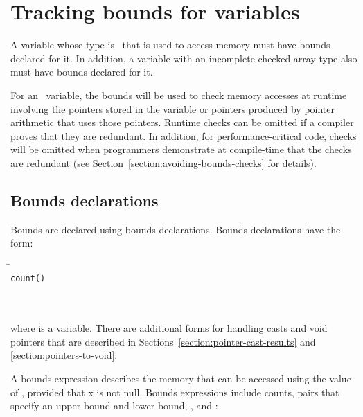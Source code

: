 
\chapter{Tracking bounds for variables}
\label{chapter:tracking-bounds}

A variable whose type is \arrayptr\ that is used to access
memory must have bounds declared for it. In addition, a variable with an
incomplete checked array type also must have bounds declared for it.

For an \arrayptr\ variable, the bounds will be used to check
memory accesses at runtime involving the pointers stored in the variable
or pointers produced by pointer arithmetic that uses those pointers.
Runtime checks can be omitted if a compiler proves that they are
redundant. In addition, for performance-critical code, checks will be
omitted when programmers demonstrate at compile-time that the checks are
redundant (see Section~\ref{section:avoiding-bounds-checks} for details).

\section{Bounds declarations}
\label{section:bounds-declarations}

Bounds are declared using bounds declarations. Bounds declarations have
the form:

\begin{quote}
\end{quote}

\begin{tabbing}
\= \\
\> \texttt{count(}\texttt{)} \\
\>  \\
\> \boundsnone \\
\> \boundsany
\end{tabbing}

where  is a variable. There are additional forms for handling
casts and void pointers that are described in 
Sections~\ref{section:pointer-cast-results} and \ref{section:pointers-to-void}.

A bounds expression describes the memory that can be accessed using the
value of , provided that x is not null. Bounds expressions
include counts, pairs that specify an upper bound and lower bound,
\boundsnone, and \boundsany:

